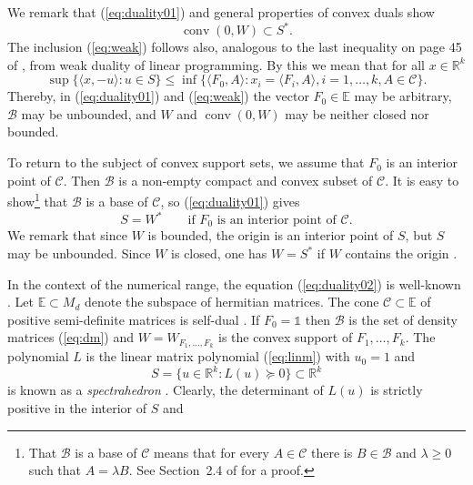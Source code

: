 \documentclass[12pt]{amsart}
\theoremstyle{definition}
\numberwithin{equation}{section}
\begin{document}
We remark that (\ref{eq:duality01}) and general properties of convex 
duals \cite{Rockafellar1970} show
\begin{equation}\label{eq:weak}
{\operatorname{conv}}(0,W)\subset S^*.
\end{equation}
The inclusion (\ref{eq:weak}) follows also, analogous to the last inequality 
on page 45 of \cite{RamanaGoldman1995}, from weak duality of linear 
programming. By this we mean that for all $x\in{\mathbb R}^k$ 
\[
\sup\{\langle x,-u\rangle : u\in S\}
\leq 
\inf\{\langle F_0,A\rangle : x_i=\langle F_i,A\rangle, 
i=1,\ldots,k, A\in{\mathcal C}\}.
\]
Thereby, in (\ref{eq:duality01}) and (\ref{eq:weak}) the vector $F_0\in{\mathbb E}$ 
may be arbitrary, ${\mathcal B}$ may be unbounded, and $W$ and ${\operatorname{conv}}(0,W)$ may be 
neither closed nor bounded.
\par
To return to the subject of convex support sets, we assume that $F_0$ is 
an interior point of ${\mathcal C}$. Then ${\mathcal B}$ is a non-empty compact and convex 
subset of ${\mathcal C}$. It is easy to show\footnote{That ${\mathcal B}$ is a base of ${\mathcal C}$ means that for every $A\in{\mathcal C}$ there is 
$B\in{\mathcal B}$ and $\lambda\geq 0$ such that $A=\lambda B$.
See Section~2.4 of \cite{Weis2011} for a proof.}
that ${\mathcal B}$ is a base of ${\mathcal C}$, so (\ref{eq:duality01}) gives
\begin{equation}\label{eq:duality02}
S = W^*
\qquad \mbox{if $F_0$ is an interior point of ${\mathcal C}$.}
\end{equation}
We remark that since $W$ is bounded, the origin is an interior point of $S$, 
but $S$ may be unbounded. Since $W$ is closed, one has $W=S^*$ if $W$ 
contains the origin \cite{Rockafellar1970}. 
\par
In the context of the numerical range, the equation (\ref{eq:duality02}) is 
well-known \cite{ChienNakazato2010,HeltonSpitkovsky2012}. Let ${\mathbb E}\subset M_d$ 
denote the subspace of hermitian matrices. The cone ${\mathcal C}\subset{\mathbb E}$ of 
positive semi-definite matrices is self-dual \cite{BermanBen-Israel1973}. If 
$F_0={\mathds{1}}$ then ${\mathcal B}$ is the set of density matrices (\ref{eq:dm}) and 
$W=W_{F_1,\ldots,F_k}$ is the convex support of $F_1,\ldots,F_k$. The 
polynomial $L$ is the linear matrix polynomial (\ref{eq:linm}) with $u_0=1$
and
\[
S=\{u\in{\mathbb R}^k : L(u)\succeq 0\} \subset{\mathbb R}^k
\] 
is known as a {\em spectrahedron} \cite{RamanaGoldman1995}. Clearly, the 
determinant of $L(u)$ is strictly positive in the interior of $S$ and 
\end{document}
